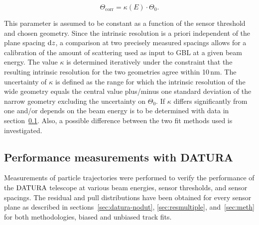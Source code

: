 \begin{equation}
 \Theta_{\textrm{corr}} = \kappa(E) \cdot \Theta_0.
 \label{eq:thetacorr}
\end{equation}

\noindent
This parameter is assumed to be constant as a function of the sensor threshold and chosen geometry. 
Since the intrinsic resolution is a priori independent of the plane spacing $\textrm{d}z$,
 a comparison at two precisely measured spacings allows for a calibration of the amount of scattering used as input to GBL at a given beam energy. 
The value $\kappa$ is determined iteratively under the constraint that the resulting intrinsic resolution for the two geometries agree within 10\,nm.
The uncertainty of $\kappa$ is defined as the range for which the intrinsic resolution of the wide geometry equals the central value plus/minus one standard deviation of the narrow geometry
 excluding the uncertainty on $\Theta_0$. 
If $\kappa$ differs significantly from one and/or depends on the beam energy is to be determined with data in section~\ref{sec:measurements}. 
Also, a possible difference between the two fit methods used is investigated. 


\subsection{Performance measurements with DATURA}
\label{sec:measurements}

Measurements of particle trajectories were performed to verify the performance of the $\textrm{DATURA}$ telescope at various beam energies, sensor thresholds, and sensor spacings. %
The residual and pull distributions have been obtained for every sensor plane as described in sections~\ref{sec:datura-nodut}, \ref{sec:resmultiple}, and~\ref{sec:meth}
 for both methodologies, biased and unbiased track fits. 
% 



